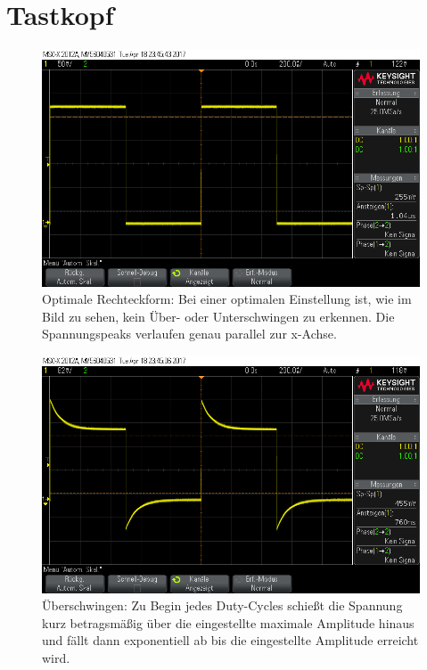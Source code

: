 \documentclass[10pt]{report}
\begin{document}
    \section{Tastkopf}

    \begin{figure}[H]
     \includegraphics[width=\textwidth]{scope_12.png}
     \caption{Optimale Rechteckform: Bei einer optimalen Einstellung ist, wie im Bild zu sehen, kein Über- oder
     Unterschwingen zu erkennen. Die Spannungspeaks verlaufen genau parallel zur
     x-Achse.}
   \end{figure}


   \begin{figure}[H]
    \includegraphics[width=\textwidth]{scope_11.png}
    \caption{Überschwingen: Zu Begin jedes Duty-Cycles schießt die Spannung kurz betragsmäßig über die
    eingestellte
    maximale Amplitude hinaus und fällt dann exponentiell ab bis die eingestellte
    Amplitude erreicht wird.}
  \end{figure}
\end{document}
